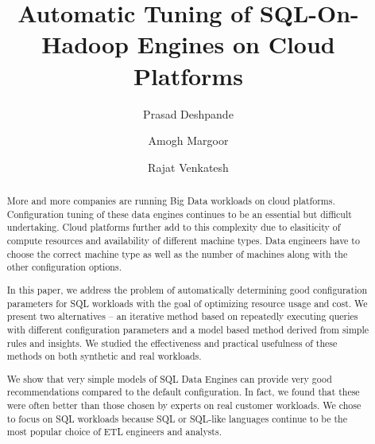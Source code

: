 \documentclass[sigconf]{acmart}
\newcommand{\eat}[1]{}
\begin{document}
\title{Automatic Tuning of SQL-On-Hadoop Engines on Cloud Platforms}

\author{Prasad Deshpande}

\author{Amogh Margoor}

\author{Rajat Venkatesh}

\renewcommand{\shortauthors}{P. Deshpande et al.}


\begin{abstract}
More and more companies are running Big Data workloads on cloud platforms. Configuration tuning of these data engines continues to be an essential but difficult undertaking. Cloud platforms further add to this complexity due to elasiticity of compute resources and availability of different machine types. Data engineers have to choose the correct machine type as well as the number of machines along with the other configuration options.

In this paper, we address the problem of automatically determining good configuration parameters for SQL workloads with the goal of optimizing resource usage and cost. We present two alternatives -- an iterative method based on repeatedly executing queries with different configuration parameters and a model based method derived from simple rules and insights. We studied the effectiveness and practical usefulness of these methods on both synthetic and real workloads.

We show that very simple models of SQL Data Engines can provide very good recommendations compared to the default configuration. In fact, we found that these were often better than those chosen by experts on real customer workloads. We chose to focus on SQL workloads because SQL or SQL-like languages continue to be the most popular choice of ETL engineers and analysts. 
\end{abstract}
\eat{
\begin{CCSXML}
<ccs2012>
<concept>
<concept_id>10002951.10002952.10003190.10003195.10010837</concept_id>
<concept_desc>Information systems~MapReduce-based systems</concept_desc>
<concept_significance>500</concept_significance>
</concept>
<concept>
<concept_id>10002951.10002952.10003190.10003195.10010838</concept_id>
<concept_desc>Information systems~Relational parallel and distributed DBMSs</concept_desc>
<concept_significance>500</concept_significance>
</concept>
<concept>
<concept_id>10002951.10002952.10003212.10003216</concept_id>
<concept_desc>Information systems~Autonomous database administration</concept_desc>
<concept_significance>500</concept_significance>
</concept>
</ccs2012>
\end{CCSXML}
}
\end{document}
